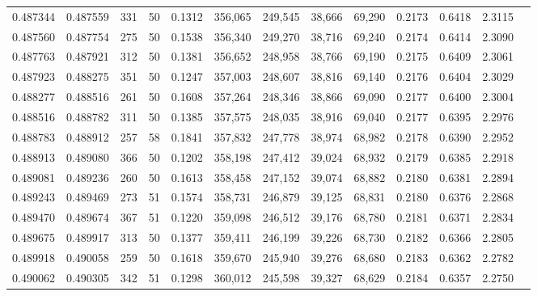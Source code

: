 \begin{tabular}{rrrrrrrrrrrrr}
0.487344 & 0.487559 &   331 &  50 &                                     0.1312 & 356,065 & 249,545 &  38,666 &  69,290 & 0.2173 & 0.6418 & 2.3115 \\
0.487560 & 0.487754 &   275 &  50 &                                     0.1538 & 356,340 & 249,270 &  38,716 &  69,240 & 0.2174 & 0.6414 & 2.3090 \\
0.487763 & 0.487921 &   312 &  50 &                                     0.1381 & 356,652 & 248,958 &  38,766 &  69,190 & 0.2175 & 0.6409 & 2.3061 \\
0.487923 & 0.488275 &   351 &  50 &                                     0.1247 & 357,003 & 248,607 &  38,816 &  69,140 & 0.2176 & 0.6404 & 2.3029 \\
0.488277 & 0.488516 &   261 &  50 &                                     0.1608 & 357,264 & 248,346 &  38,866 &  69,090 & 0.2177 & 0.6400 & 2.3004 \\
0.488516 & 0.488782 &   311 &  50 &                                     0.1385 & 357,575 & 248,035 &  38,916 &  69,040 & 0.2177 & 0.6395 & 2.2976 \\
0.488783 & 0.488912 &   257 &  58 &                                     0.1841 & 357,832 & 247,778 &  38,974 &  68,982 & 0.2178 & 0.6390 & 2.2952 \\
0.488913 & 0.489080 &   366 &  50 &                                     0.1202 & 358,198 & 247,412 &  39,024 &  68,932 & 0.2179 & 0.6385 & 2.2918 \\
0.489081 & 0.489236 &   260 &  50 &                                     0.1613 & 358,458 & 247,152 &  39,074 &  68,882 & 0.2180 & 0.6381 & 2.2894 \\
0.489243 & 0.489469 &   273 &  51 &                                     0.1574 & 358,731 & 246,879 &  39,125 &  68,831 & 0.2180 & 0.6376 & 2.2868 \\
0.489470 & 0.489674 &   367 &  51 &                                     0.1220 & 359,098 & 246,512 &  39,176 &  68,780 & 0.2181 & 0.6371 & 2.2834 \\
0.489675 & 0.489917 &   313 &  50 &                                     0.1377 & 359,411 & 246,199 &  39,226 &  68,730 & 0.2182 & 0.6366 & 2.2805 \\
0.489918 & 0.490058 &   259 &  50 &                                     0.1618 & 359,670 & 245,940 &  39,276 &  68,680 & 0.2183 & 0.6362 & 2.2782 \\
0.490062 & 0.490305 &   342 &  51 &                                     0.1298 & 360,012 & 245,598 &  39,327 &  68,629 & 0.2184 & 0.6357 & 2.2750 \\

\end{tabular}

